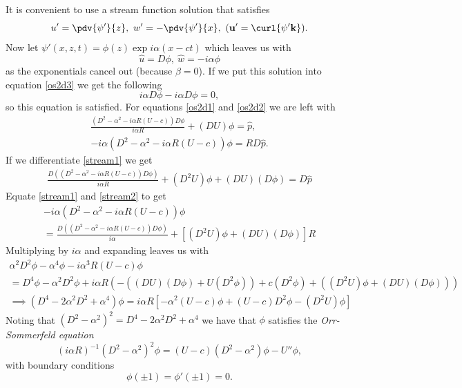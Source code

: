 It is convenient to use a stream function solution that satisfies
\begin{equation}
    u' = \pdv{\psi'}{z}, \ w' = - \pdv{\psi'}{x},  \ (\mathbf{u}' = \curl{\psi' \mathbf{k}}).
\end{equation}
Now let $ \psi'(x, z, t) = \phi(z) \exp{i \alpha(x - ct)} $ which leaves us with
\begin{equation}
    \hat{u} = D \phi, \  \hat{w} = -i \alpha \phi
\end{equation}
as the exponentials cancel out (because $ \beta = 0$). If we put this solution into equation \eqref{os2d3} we get the following
\begin{equation}
    i \alpha D \phi - i \alpha D \phi = 0,
\end{equation}
so this equation is satisfied. For equations \eqref{os2d1} and \eqref{os2d2} we are left with
\begin{gather}
    \frac{(D^2 - \alpha^2 - i \alpha R ( U - c)) D \phi}{i \alpha R} + (DU) \phi = \hat{p}, \label{stream1}\\
    -i \alpha (D^2 - \alpha^2 - i \alpha R (U - c)) \phi = R D \hat{p}. \label{stream2}
\end{gather}
If we differentiate \eqref{stream1} we get
\begin{gather}
     \frac{D((D^2 - \alpha^2 - i \alpha R ( U - c)) D \phi)}{i \alpha R} + (D^2 U) \phi + (DU)(D \phi) = D \hat{p}
\end{gather}
Equate \eqref{stream1} and \eqref{stream2} to get
\begin{gather}
        -i \alpha (D^2 - \alpha^2 - i \alpha R (U - c)) \phi \nonumber\\ = \frac{D((D^2 - \alpha^2 - i \alpha R ( U - c)) D \phi)}{i \alpha} + [(D^2 U) \phi + (DU)(D \phi)] R
\end{gather}
Multiplying by $ i \alpha $ and expanding leaves us with 
\begin{gather}
    \alpha^2 D^2 \phi - \alpha^4 \phi - i \alpha^3 R (U - c) \phi\nonumber\\  = D^4 \phi - \alpha^2 D^2 \phi + i \alpha R (-( (DU) (D\phi) + U (D^2 \phi)) + c (D^2 \phi) + ((D^2 U) \phi + (DU)(D\phi))) 
    \nonumber\\ 
    \implies (D^4 - 2 \alpha^2 D^2 + \alpha^4) \phi = i \alpha R [- \alpha^2 (U - c) \phi + (U - c)D^2\phi - (D^2U)\phi]
\end{gather}
Noting that $ (D^2 - \alpha^2)^2 = D^4 - 2 \alpha^2 D^2 + \alpha^4 $ we have that $ \phi $ satisfies the \emph{Orr-Sommerfeld equation}
\begin{equation}
    (i \alpha R)^{-1} (D^2 - \alpha^2)^2 \phi = (U - c)(D^2 - \alpha^2)\phi - U'' \phi,
\label{oseq}
\end{equation}
with boundary conditions 
\begin{equation}
    \phi(\pm 1) = \phi'(\pm 1) = 0.
\end{equation}











